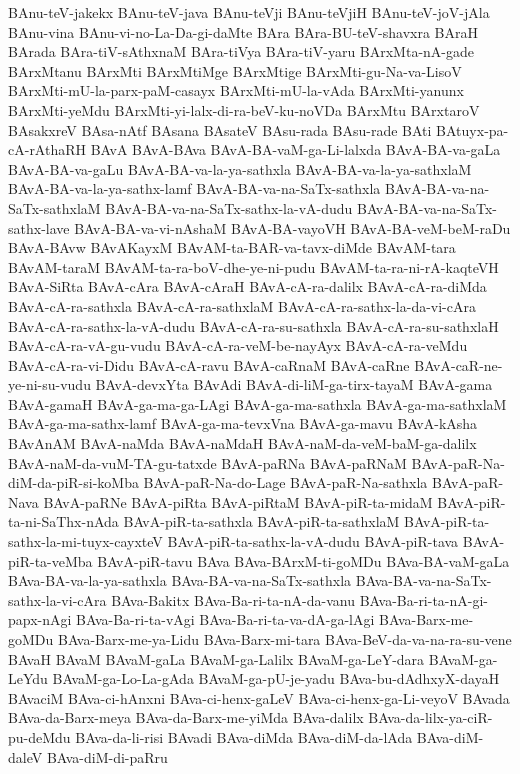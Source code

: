 {BAnu-teV-jakekx
BAnu-teV-java
BAnu-teVji
BAnu-teVjiH
BAnu-teV-joV-jAla
BAnu-vina
BAnu-vi-no-La-Da-gi-daMte
BAra
BAra-BU-teV-shavxra
BAraH
BArada
BAra-tiV-sAthxnaM
BAra-tiVya
BAra-tiV-yaru
BArxMta-nA-gade
BArxMtanu
BArxMti
BArxMtiMge
BArxMtige
BArxMti-gu-Na-va-LisoV
BArxMti-mU-la-parx-paM-casayx
BArxMti-mU-la-vAda
BArxMti-yanunx
BArxMti-yeMdu
BArxMti-yi-lalx-di-ra-beV-ku-noVDa
BArxMtu
BArxtaroV
BAsakxreV
BAsa-nAtf
BAsana
BAsateV
BAsu-rada
BAsu-rade
BAti
BAtuyx-pa-cA-rAthaRH
BAvA
BAvA-BAva
BAvA-BA-vaM-ga-Li-lalxda
BAvA-BA-va-gaLa
BAvA-BA-va-gaLu
BAvA-BA-va-la-ya-sathxla
BAvA-BA-va-la-ya-sathxlaM
BAvA-BA-va-la-ya-sathx-lamf
BAvA-BA-va-na-SaTx-sathxla
BAvA-BA-va-na-SaTx-sathxlaM
BAvA-BA-va-na-SaTx-sathx-la-vA-dudu
BAvA-BA-va-na-SaTx-sathx-lave
BAvA-BA-va-vi-nAshaM
BAvA-BA-vayoVH
BAvA-BA-veM-beM-raDu
BAvA-BAvw
BAvAKayxM
BAvAM-ta-BAR-va-tavx-diMde
BAvAM-tara
BAvAM-taraM
BAvAM-ta-ra-boV-dhe-ye-ni-pudu
BAvAM-ta-ra-ni-rA-kaqteVH
BAvA-SiRta
BAvA-cAra
BAvA-cAraH
BAvA-cA-ra-dalilx
BAvA-cA-ra-diMda
BAvA-cA-ra-sathxla
BAvA-cA-ra-sathxlaM
BAvA-cA-ra-sathx-la-da-vi-cAra
BAvA-cA-ra-sathx-la-vA-dudu
BAvA-cA-ra-su-sathxla
BAvA-cA-ra-su-sathxlaH
BAvA-cA-ra-vA-gu-vudu
BAvA-cA-ra-veM-be-nayAyx
BAvA-cA-ra-veMdu
BAvA-cA-ra-vi-Didu
BAvA-cA-ravu
BAvA-caRnaM
BAvA-caRne
BAvA-caR-ne-ye-ni-su-vudu
BAvA-devxYta
BAvAdi
BAvA-di-liM-ga-tirx-tayaM
BAvA-gama
BAvA-gamaH
BAvA-ga-ma-ga-LAgi
BAvA-ga-ma-sathxla
BAvA-ga-ma-sathxlaM
BAvA-ga-ma-sathx-lamf
BAvA-ga-ma-tevxVna
BAvA-ga-mavu
BAvA-kAsha
BAvAnAM
BAvA-naMda
BAvA-naMdaH
BAvA-naM-da-veM-baM-ga-dalilx
BAvA-naM-da-vuM-TA-gu-tatxde
BAvA-paRNa
BAvA-paRNaM
BAvA-paR-Na-diM-da-piR-si-koMba
BAvA-paR-Na-do-Lage
BAvA-paR-Na-sathxla
BAvA-paR-Nava
BAvA-paRNe
BAvA-piRta
BAvA-piRtaM
BAvA-piR-ta-midaM
BAvA-piR-ta-ni-SaThx-nAda
BAvA-piR-ta-sathxla
BAvA-piR-ta-sathxlaM
BAvA-piR-ta-sathx-la-mi-tuyx-cayxteV
BAvA-piR-ta-sathx-la-vA-dudu
BAvA-piR-tava
BAvA-piR-ta-veMba
BAvA-piR-tavu
BAva
BAva-BArxM-ti-goMDu
BAva-BA-vaM-gaLa
BAva-BA-va-la-ya-sathxla
BAva-BA-va-na-SaTx-sathxla
BAva-BA-va-na-SaTx-sathx-la-vi-cAra
BAva-Bakitx
BAva-Ba-ri-ta-nA-da-vanu
BAva-Ba-ri-ta-nA-gi-papx-nAgi
BAva-Ba-ri-ta-vAgi
BAva-Ba-ri-ta-va-dA-ga-lAgi
BAva-Barx-me-goMDu
BAva-Barx-me-ya-Lidu
BAva-Barx-mi-tara
BAva-BeV-da-va-na-ra-su-vene
BAvaH
BAvaM
BAvaM-gaLa
BAvaM-ga-Lalilx
BAvaM-ga-LeY-dara
BAvaM-ga-LeYdu
BAvaM-ga-Lo-La-gAda
BAvaM-ga-pU-je-yadu
BAva-bu-dAdhxyX-dayaH
BAvaciM
BAva-ci-hAnxni
BAva-ci-henx-gaLeV
BAva-ci-henx-ga-Li-veyoV
BAvada
BAva-da-Barx-meya
BAva-da-Barx-me-yiMda
BAva-dalilx
BAva-da-lilx-ya-ciR-pu-deMdu
BAva-da-li-risi
BAvadi
BAva-diMda
BAva-diM-da-lAda
BAva-diM-daleV
BAva-diM-di-paRru
}
